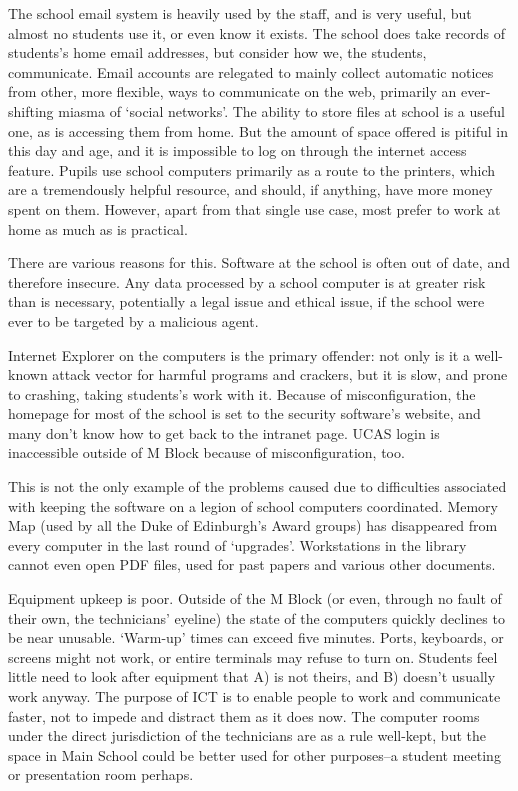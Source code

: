 \documentclass[a4paper,leqno,titlepage]{article}
\begin{document}
The school email system is heavily used by the staff, and is very useful, but
almost no students use it, or even know it exists. The school does take records
of students's home email addresses, but consider how we, the students,
communicate. Email accounts are relegated to mainly collect automatic notices
from other, more flexible, ways to communicate on the web, primarily an
ever-shifting miasma of `social networks'.
The ability to store files at school is a useful one, as is accessing them from
home. But the amount of space offered is pitiful in this day and age, and it is
impossible to log on through the internet access feature.
Pupils use school computers primarily as a route to the printers, which are a
tremendously helpful resource, and should, if anything, have more money spent on them.
However, apart from that single use case,
most prefer to work at home as much as is practical.

There are various reasons for this.
Software at the school is often out of date, and therefore insecure.
Any data processed by a school computer is at greater risk than is necessary,
potentially a legal issue and ethical issue, if the school were ever to be
targeted by a malicious agent.


Internet Explorer on the computers is the primary offender: not only is it
a well-known attack vector for harmful programs and crackers, but it is slow, and
prone to crashing, taking students's work with it. Because of misconfiguration,
the homepage for most of the school is set to the security software's website,
and many don't know how to get back to the intranet page. UCAS login is
inaccessible outside of M Block because of misconfiguration, too.


This is not the only example of the problems caused due to difficulties
associated with keeping the software on a legion of school computers
coordinated. Memory Map (used by all the Duke of Edinburgh's Award groups) has
disappeared from every computer in the last round of `upgrades'. Workstations
in the library cannot even open PDF files, used for past papers and various
other documents.


Equipment upkeep is poor. Outside of the M Block (or even, through no fault of
their own, the technicians' eyeline) the state of the computers quickly declines
to be near unusable. `Warm-up' times can exceed five minutes. Ports, keyboards,
or screens might not work, or entire terminals may refuse to turn on.
Students feel little need to look after equipment that A) is not theirs,
and B) doesn't usually work anyway. The purpose of ICT is to enable
people to work and communicate faster, not to impede and distract them as it
does now. The computer rooms under the direct jurisdiction of the
technicians are as a rule well-kept, but the space in Main School could be
better used for other purposes--a student meeting or presentation room perhaps.
\end{document}
